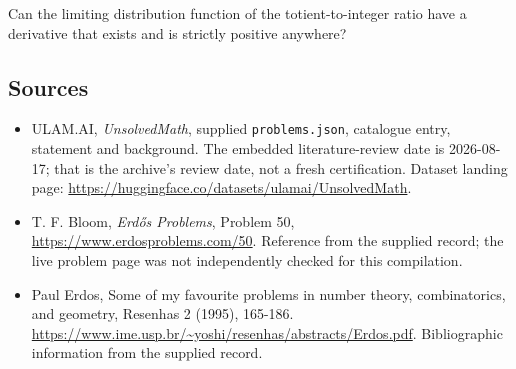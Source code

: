 \documentclass[11pt,a4paper]{article}
\begin{document}
Can the limiting distribution function of the totient-to-integer ratio have a derivative that exists and is strictly positive anywhere?

\subsection{Sources}

{\small

\begin{itemize}

\item[\hypertarget{source:statement:1}{S1}] ULAM.AI, \emph{UnsolvedMath}, supplied \texttt{problems.json}, catalogue entry, statement and background. The embedded literature-review date is 2026-08-17; that is the archive’s review date, not a fresh certification. Dataset landing page: \url{https://huggingface.co/datasets/ulamai/UnsolvedMath}.

\item[\hypertarget{source:statement:2}{S2}] T. F. Bloom, \emph{Erdős Problems}, Problem 50, \url{https://www.erdosproblems.com/50}. Reference from the supplied record; the live problem page was not independently checked for this compilation.

\item[\hypertarget{source:statement:3}{S3}] Paul Erdos, Some of my favourite problems in number theory, combinatorics, and geometry, Resenhas 2 (1995), 165-186. \url{https://www.ime.usp.br/~yoshi/resenhas/abstracts/Erdos.pdf}. Bibliographic information from the supplied record.

\end{itemize}

}

\label{end:statement}
\end{document}
